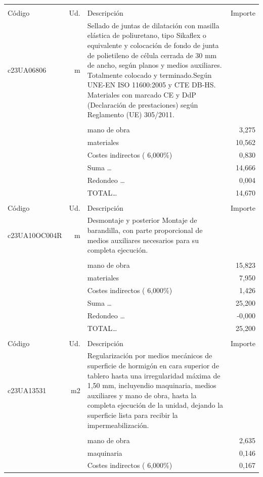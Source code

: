 \documentclass{book}%
\begin{document}
\begin{supertabular}{l r p{60mm} r}
&&&\\%
Código&Ud.&Descripción&Importe\\%
\hline%
c23UA06806&m&Sellado de juntas de dilatación con masilla elástica de poliuretano, tipo Sikaflex o equivalente y colocación de fondo de junta de polietileno de célula cerrada de 30 mm de ancho, según planos y medios auxiliares. Totalmente colocado y terminado.Según UNE{-}EN ISO 11600:2005 y CTE DB{-}HS. Materiales con marcado CE y DdP (Declaración de prestaciones) según Reglamento (UE) 305/2011.&\\%
&&&\\%
&&mano de obra&     3,275\\%
&&materiales&    10,562\\%
&&Costes indirectos (     6,000\%)&     0,830\\%
&&Suma \ldots&    14,666\\%
&&Redondeo \ldots&     0,004\\%
%
&&TOTAL\ldots&    14,670\\%
&&&\\%
Código&Ud.&Descripción&Importe\\%
\hline%
c23UA10OC004R&m&Desmontaje y posterior Montaje de barandilla, con parte proporcional de medios auxiliares necesarios para su completa ejecución.&\\%
&&&\\%
&&mano de obra&    15,823\\%
&&materiales&     7,950\\%
&&Costes indirectos (     6,000\%)&     1,426\\%
&&Suma \ldots&    25,200\\%
&&Redondeo \ldots&    {-}0,000\\%
%
&&TOTAL\ldots&    25,200\\%
&&&\\%
Código&Ud.&Descripción&Importe\\%
\hline%
c23UA13531&m2&Regularización por medios mecánicos de superficie de hormigón en cara superior de tablero hasta una irregularidad máxima de 1,50 mm, incluyendio maquinaria, medios auxiliares y mano de obra, hasta la completa ejecución de la unidad, dejando la superficie lista para recibir la impermeabilización.&\\%
&&&\\%
&&mano de obra&     2,635\\%
&&maquinaria&     0,146\\%
&&Costes indirectos (     6,000\%)&     0,167\\%

\end{supertabular}
\end{document}
